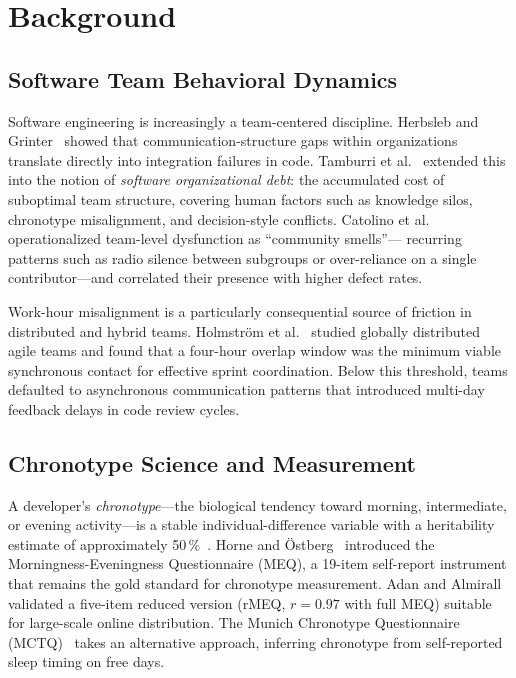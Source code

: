\documentclass[conference]{IEEEtran}
\begin{document}
\section{Background}
\label{sec:background}

\subsection{Software Team Behavioral Dynamics}

Software engineering is increasingly a team-centered discipline.
Herbsleb and Grinter~\cite{herbsleb1999} showed that
communication-structure gaps within organizations translate directly
into integration failures in code.  Tamburri et al.~\cite{tamburri2019}
extended this into the notion of \textit{software organizational
debt}: the accumulated cost of suboptimal team structure, covering
human factors such as knowledge silos, chronotype misalignment, and
decision-style conflicts.  Catolino et al.~\cite{catolino2019}
operationalized team-level dysfunction as ``community smells''---
recurring patterns such as radio silence between subgroups or
over-reliance on a single contributor---and correlated their
presence with higher defect rates.

Work-hour misalignment is a particularly consequential source of
friction in distributed and hybrid teams.  Holmstr\"{o}m et
al.~\cite{holmstrom2006} studied globally distributed agile teams
and found that a four-hour overlap window was the minimum viable
synchronous contact for effective sprint coordination.  Below this
threshold, teams defaulted to asynchronous communication patterns
that introduced multi-day feedback delays in code review cycles.

\subsection{Chronotype Science and Measurement}

A developer's \textit{chronotype}---the biological tendency toward
morning, intermediate, or evening activity---is a stable
individual-difference variable with a heritability estimate of
approximately 50\,\%~\cite{roenneberg2003}.  Horne and
\"{O}stberg~\cite{horne1976} introduced the Morningness-Eveningness
Questionnaire (MEQ), a 19-item self-report instrument that remains
the gold standard for chronotype measurement.  Adan and
Almirall~\cite{adan1991} validated a five-item reduced version
(rMEQ, $r = 0.97$ with full MEQ) suitable for large-scale online
distribution.  The Munich Chronotype Questionnaire
(MCTQ)~\cite{roenneberg2003} takes an alternative approach, inferring
chronotype from self-reported sleep timing on free days.
\end{document}
